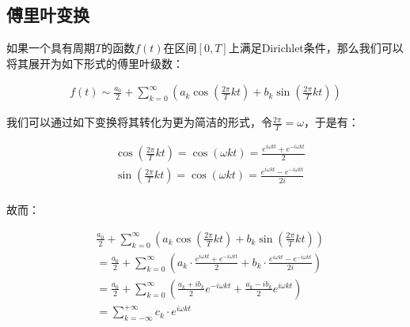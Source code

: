 \documentclass[UTF8]{book}
\begin{document}
\subsection{傅里叶变换}
如果一个具有周期$T$的函数$f(t)$在区间$\left [ 0,T \right ]$上满足Dirichlet条件，那么我们可以将其展开为如下形式的傅里叶级数：
\begin{large}
    \begin{equation}
        \begin{aligned}
            f(t) \sim \frac{a_0}{2}+\sum_{k=0}^{\infty}{\left ( a_k\cos \left (\frac{2\pi}{T}kt\right )+b_k\sin\left (\frac{2\pi}{T}kt\right ) \right )}
            \nonumber
        \end{aligned}
    \end{equation}
\end{large}
我们可以通过如下变换将其转化为更为简洁的形式，令$\frac{2\pi}{T}=\omega$，于是有：
\begin{large}
    \begin{equation}
        \begin{aligned}
            &\cos\left (\frac{2\pi}{T}kt\right )=\cos(\omega kt)=\frac{e^{i\omega kt}+e^{-i\omega kt}}{2} \\
            &\sin\left (\frac{2\pi}{T}kt\right )=\cos(\omega kt)=\frac{e^{i\omega kt}-e^{-i\omega kt}}{2i} \\
            \nonumber
        \end{aligned}
    \end{equation}
\end{large}
故而：
\begin{large}
    \begin{equation}
        \begin{aligned}
            &\frac{a_0}{2}+\sum_{k=0}^{\infty}{\left ( a_k\cos \left (\frac{2\pi}{T}kt\right )+b_k\sin\left (\frac{2\pi}{T}kt\right ) \right )} \\
            &=\frac{a_0}{2}+\sum_{k=0}^{\infty}\left (a_k \cdot \frac{e^{i\omega kt}+e^{-i\omega kt}}{2}+b_k \cdot \frac{e^{i\omega kt}-e^{-i\omega kt}}{2i} \right ) \\
            &=\frac{a_0}{2}+\sum_{k=0}^{\infty}\left ( \frac{a_k+ib_k}{2}e^{-i\omega kt}+\frac{a_k-ib_k}{2}e^{i\omega kt} \right ) \\
            &=\sum_{k=-\infty}^{+\infty} c_k \cdot e^{i\omega kt}
            \nonumber
        \end{aligned}
    \end{equation}
\end{large}
\end{document}
